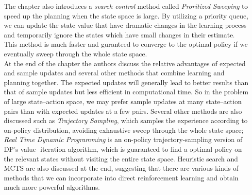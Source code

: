 \documentclass[12pt,a4paper]{article}
\begin{document}
The chapter also introduces a \textit{search control} method called \textit{Proritized Sweeping} to speed up the planning when the state space is large. By utilizing a priority queue, we can update the state value that have dramatic changes in the learning process and temporarily ignore the states which have small changes in their estimate. This method is much faster and guranteed to converge to the optimal policy if we eventually sweep through the whole state space.\\

At the end of the chapter the authors discuss the relative advantages of expected and sample updates and several other methods that combine learning and planning together. The expected updates will generally lead to better results than that of sample updates but less efficient in computational time. So in the problem of large state–action space, we may prefer sample updates at many state–action pairs than with expected updates at a few pairs. Several other methods are also discussed such as \textit{Trajectory Sampling}, which samples the experience according to on-policy distribution, avoiding exhaustive sweep through the whole state space; \textit{Real Time Dynamic Programming} is an on-policy trajectory-sampling version of DP’s value-
iteration algorithm, which is guaranteed to find a optimal policy on the relevant states without visiting the entire state space. Heuristic search and MCTS are also discussed at the end, suggesting that there are various kinds of methods that we can incorporate into direct reinforcement learning and obtain much more powerful algorithms.    
\end{document}
